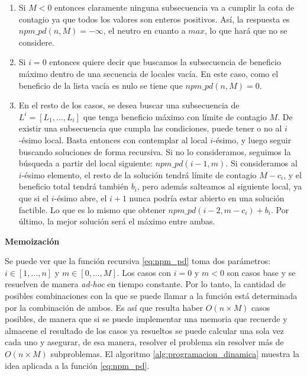 \begin{enumerate}[label=\alph*.]
    \item Si $M<0$ entonces claramente ninguna subsecuencia va a cumplir la cota de contagio ya que todos los valores son enteros positivos. Así, la respuesta es $npm\_pd(n,M) = -\infty$, el neutro en cuanto a $max$, lo que hará que no se considere.

    \item Si $i=0$ entonces quiere decir que buscamos la subsecuencia de beneficio máximo dentro de una secuencia de locales vacía. En este caso, como el beneficio de la lista vacía es nulo se tiene que $npm\_pd(n,M) = 0$.
    
    \item En el resto de los casos, se desea buscar una subsecuencia de $L^i=[L_1,\dots,L_i]$ que tenga beneficio máximo con límite de contagio $M$. De existir una subsecuencia que cumpla las condiciones, puede tener o no al $i$-ésimo local. Basta entonces con contemplar al local $i$-ésimo, y luego seguir buscando soluciones de forma recursiva. Si no lo consideramos, seguimos la búsqueda a partir del local siguiente: $npm\_pd(i-1,m)$. Si consideramos al $i$-ésimo elemento, el resto de la solución tendrá límite de contagio $M - c_i$, y el beneficio total tendrá también $b_i$, pero además salteamos al siguiente local, ya que si el $i$-ésimo abre, el $i + 1$ nunca podría estar abierto en una solución factible. Lo que es lo mismo que obtener $npm\_pd(i-2, m-c_i) + b_i$. Por último, la mejor solución será el máximo entre ambas.
\end{enumerate}

\textbf{Memoización}

Se puede ver que la función recursiva \ref{eq:npm_pd} toma dos parámetros: $i \in [1,\dots,n]$ y $m \in [0,\dots,M]$. Los casos con $i=0$ y $m<0$ son casos base y se resuelven de manera \textit{ad-hoc} en tiempo constante. Por lo tanto, la cantidad de posibles combinaciones con la que se puede llamar a la función está determinada por la combinación de ambos. Es así que resulta haber $O(n\times M)$ casos posibles, de manera que si se puede implementar una memoria que recuerde y almacene el resultado de los casos ya resueltos se puede calcular una sola vez cada uno y asegurar, de esa manera, resolver el problema sin resolver más de $O(n\times M)$ subproblemas. El algoritmo \ref{alg:programacion_dinamica} muestra la idea aplicada a la función \ref{eq:npm_pd}.

